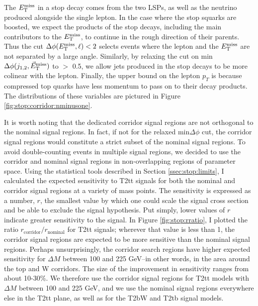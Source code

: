 The $E_\text{T}^\text{miss}$ in a stop decay comes from the two LSPs, as well as the
neutrino produced alongside the single lepton. In the case where the
stop squarks are boosted, we expect the products of the stop decays,
including the main contributors to the
$E_\text{T}^\text{miss}$, to continue in the rough direction of their parents. Thus the cut
$\Delta\phi (E_\text{T}^\text{miss}, \ell) < 2$ selects events where the lepton and the
$E_\text{T}^\text{miss}$ are not separated by a large angle. Similarly, by relaxing
the cut on min$\Delta \phi(j_{1,2},\vec{E}_\text{T}^\text{miss})$ to $>$ 0.5, we allow jets
produced in the stop decays to be more colinear with the lepton.
Finally, the upper bound on the lepton $p_T$ is because compressed top
quarks have less momentum to pass on to their decay products.
The distributions of these variables are pictured in Figure
\ref{fig:stop:corridor:nminusone}.

It is worth noting that the dedicated corridor signal regions are not
orthogonal to the nominal signal regions. In fact, if not for the
relaxed min$\Delta\phi$ cut, the corridor signal regions would
constitute a strict subset of the nominal signal regions. To avoid
double-counting events in multiple signal regions, we decided to use
the corridor and nominal signal regions in non-overlapping regions of
parameter space. Using the statistical tools described in Section
\ref{ssec:stop:limits}, I calculated the expected sensitivity to T2tt
signals for both the nominal and corridor signal regions at a variety
of mass points. The sensitivity is expressed as a number, $r$, the
smallest value by which one could scale the signal cross section and
be able to exclude the signal hypothesis. Put simply, lower values
of $r$ indicate greater sensitivity to the signal. In Figure
\ref{fig:stop:rratio}, I plotted the ratio
$r_\text{corridor} / r_\text{nominal}$ for T2tt signals; wherever that value is less
than 1, the corridor signal regions are expected to be more sensitive
than the nominal signal regions. Perhaps unsurprisingly, the corridor search
regions have higher expected sensitivity for $\Delta M$ between 100 and
225 GeV--in other words, in the area around the top and W
corridors. The size of the improvement in sensitivity ranges from
about 10-30\%. We therefore use the corridor signal regions for
T2tt models with $\Delta M$ between 100 and 225 GeV, and we use
the nominal signal regions everywhere else in the T2tt plane, as well
as for the T2bW and T2tb signal models.

